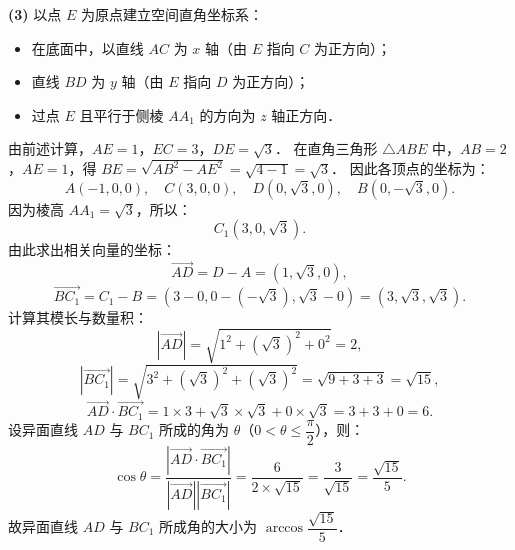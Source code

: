 \begin{answer}
\textbf{(3)}
以点 $E$ 为原点建立空间直角坐标系：
\begin{itemize}
\item 在底面中，以直线 $AC$ 为 $x$ 轴（由 $E$ 指向 $C$ 为正方向）；
\item 直线 $BD$ 为 $y$ 轴（由 $E$ 指向 $D$ 为正方向）；
\item 过点 $E$ 且平行于侧棱 $AA_1$ 的方向为 $z$ 轴正方向．
\end{itemize}
由前述计算，$AE = 1$，$EC = 3$，$DE = \sqrt{3}$．
在直角三角形 $\triangle ABE$ 中，$AB = 2$，$AE = 1$，得 $BE = \sqrt{AB^2 - AE^2} = \sqrt{4 - 1} = \sqrt{3}$．
因此各顶点的坐标为：
\nopagebreak[4]
\[
A(-1, 0, 0), \quad C(3, 0, 0), \quad D(0, \sqrt{3}, 0), \quad B(0, -\sqrt{3}, 0).
\]
因为棱高 $AA_1 = \sqrt{3}$，所以：
\nopagebreak[4]
\[
C_1(3, 0, \sqrt{3}).
\]
由此求出相关向量的坐标：
\nopagebreak[4]
\[
\vec{AD} = D - A = (1, \sqrt{3}, 0),
\]
\nopagebreak[4]
\[
\vec{BC_1} = C_1 - B = (3 - 0, 0 - (-\sqrt{3}), \sqrt{3} - 0) = (3, \sqrt{3}, \sqrt{3}).
\]
计算其模长与数量积：
\nopagebreak[4]
\[
|\vec{AD}| = \sqrt{1^2 + (\sqrt{3})^2 + 0^2} = 2,
\]
\nopagebreak[4]
\[
|\vec{BC_1}| = \sqrt{3^2 + (\sqrt{3})^2 + (\sqrt{3})^2} = \sqrt{9 + 3 + 3} = \sqrt{15},
\]
\nopagebreak[4]
\[
\vec{AD} \cdot \vec{BC_1} = 1 \times 3 + \sqrt{3} \times \sqrt{3} + 0 \times \sqrt{3} = 3 + 3 + 0 = 6.
\]
设异面直线 $AD$ 与 $BC_1$ 所成的角为 $\theta$（$0 < \theta \leqslant \dfrac{\pi}{2}$），则：
\nopagebreak[4]
\[
\cos\theta = \frac{|\vec{AD} \cdot \vec{BC_1}|}{|\vec{AD}| |\vec{BC_1}|} = \frac{6}{2 \times \sqrt{15}} = \frac{3}{\sqrt{15}} = \frac{\sqrt{15}}{5}.
\]
故异面直线 $AD$ 与 $BC_1$ 所成角的大小为 $\arccos\dfrac{\sqrt{15}}{5}$．




\end{answer}
